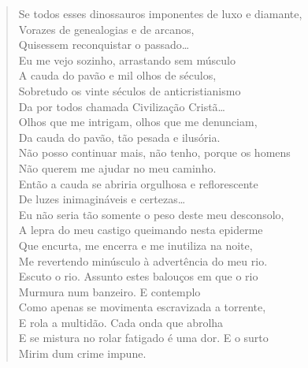 \begin{verse}
Se todos esses dinossauros imponentes de luxo e diamante,\\
Vorazes de genealogias e de arcanos,\\
Quisessem reconquistar o passado\ldots{}\\
Eu me vejo sozinho, arrastando sem músculo\\
A cauda do pavão e mil olhos de séculos,\\
Sobretudo os vinte séculos de anticristianismo\\
Da por todos chamada Civilização Cristã\ldots{}\\
Olhos que me intrigam, olhos que me denunciam,\\
Da cauda do pavão, tão pesada e ilusória.\\
Não posso continuar mais, não tenho, porque os homens\\
Não querem me ajudar no meu caminho.\\
Então a cauda se abriria orgulhosa e reflorescente\\
De luzes inimagináveis e certezas\ldots{}\\
Eu não seria tão somente o peso deste meu desconsolo,\\
A lepra do meu castigo queimando nesta epiderme\\
Que encurta, me encerra e me inutiliza na noite,\\
Me revertendo minúsculo à advertência do meu rio.\\
Escuto o rio. Assunto estes balouços em que o rio\\
Murmura num banzeiro. E contemplo\\
Como apenas se movimenta escravizada a torrente,\\
E rola a multidão. Cada onda que abrolha\\
E se mistura no rolar fatigado é uma dor. E o surto\\
Mirim dum crime impune.


\end{verse}
